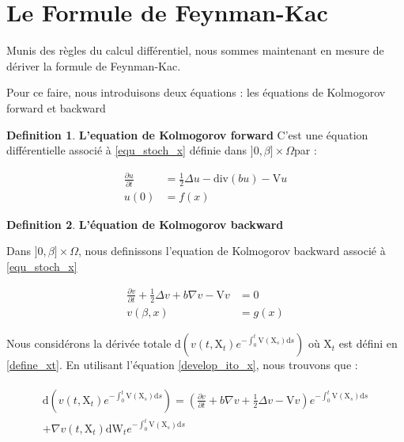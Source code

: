 \documentclass[11pt]{article}
\theoremstyle{definition}
\newtheorem{definition}{Definition}[section]
\theoremstyle{remark}
\begin{document}
\section{Le Formule de Feynman-Kac}

Munis des règles du calcul différentiel, nous sommes maintenant en mesure de dériver la formule de Feynman-Kac.

Pour ce faire, nous introduisons deux équations : les équations de Kolmogorov forward et backward 

\begin{definition}{\textbf{L'equation de Kolmogorov forward}}
C'est une équation différentielle associé à \eqref{equ_stoch_x} définie  dans $]0,\beta] \times \Omega$par : 

\begin{equation}
\label{kolmo_forw}
\begin{split}
\frac{\partial u}{\partial t} &= \frac{1}{2} \Delta u - \mathrm{div}(bu) - \mathrm{V}u \\
u(0) &= f(x)
\end{split}
\end{equation}

\end{definition}



\begin{definition}{\textbf{L'équation de Kolmogorov backward}}

Dans $]0,\beta] \times \Omega$, nous definissons l'equation de Kolmogorov backward associé à \eqref{equ_stoch_x}

\begin{equation}
\label{kolmo_back}
\begin{split}
\frac{\partial v}{\partial t} + \frac{1}{2} \Delta v + b \nabla v - \mathrm{V}v &= 0 \\
v(\beta, x) &= g(x)
\end{split}
\end{equation}
\end{definition}

Nous considérons la dérivée totale $\mathrm{d}(v(t, \mathrm{X}_{t}) e^{-\int_0^{t} \mathrm{V}(\mathrm{X}_{s}) \mathrm{d}s})$ où $\mathrm{X}_{t}$ est défini en \eqref{define_xt}. En utilisant l'équation \eqref{develop_ito_x}, nous trouvons que :

\begin{multline}
\begin{split}
\mathrm{d}(v(t, \mathrm{X}_{t}) e^{-\int_0^{t} \mathrm{V}(\mathrm{X}_{s}) \mathrm{d}s}) = (\frac{\partial v}{\partial t} + b \nabla v + \frac{1}{2}\Delta v - \mathrm{V}v)e^{-\int_0^{t} \mathrm{V}(\mathrm{X}_{s}) \mathrm{d}s} \\
+ \nabla v(t, \mathrm{X}_t)\mathrm{dW}_{t} e^{-\int_0^{t} \mathrm{V}(\mathrm{X}_{s}) \mathrm{d}s}
\end{split}
\end{multline}
\end{document}
